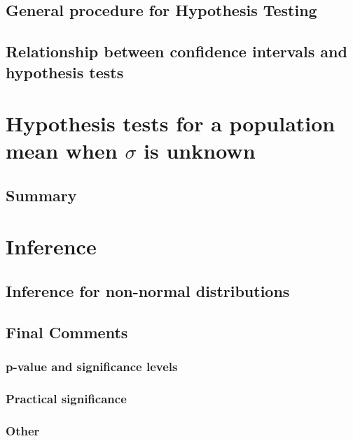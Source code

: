 \subsection{General procedure for Hypothesis Testing}  %
\subsection{Relationship between confidence intervals and hypothesis tests}  %

\section{Hypothesis tests for a population mean when $\sigma$ is unknown}  %
\subsection{Summary}  %

\section{Inference}  %
\subsection{Inference for non-normal distributions}  %
\subsection{Final Comments}  %
\subsubsection{p-value and significance levels}  %
\subsubsection{Practical significance}  %
\subsubsection{Other}  %
